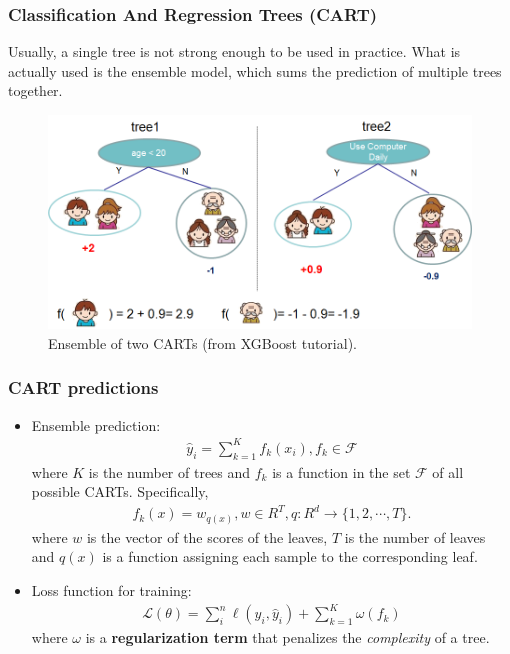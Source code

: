 \documentclass{beamer}
\begin{document}
\begin{frame}
	\frametitle{Classification And Regression Trees (CART)}
	Usually, a single tree is not strong enough to be used in practice. What is actually used is the ensemble model, which sums the prediction of multiple trees together.
	\begin{figure}
		\centering
		\includegraphics[scale=.5]{images/twocart}
		\caption{Ensemble of two CARTs (from XGBoost tutorial).}
		\label{fig:bagging}
	\end{figure}
\end{frame}

\begin{frame}
	\frametitle{CART predictions}
	
	\begin{itemize}
		\item Ensemble prediction:
		\begin{align*}
			\hat{y}_i = \sum_{k=1}^K f_k(x_i), f_k \in \mathcal{F}
		\end{align*}
		where $K$ is the number of trees and $f_k$ is a function in the set $\mathcal{F}$ of all possible CARTs. Specifically,
		\begin{align*}
			f_k(x) = w_{q(x)}, w \in R^T, q:R^d\rightarrow \{1,2,\cdots,T\} .
		\end{align*}
		where $w$ is the vector of the scores of the leaves, $T$ is the number of leaves and $q(x)$ is a function assigning each sample to the corresponding leaf.
		\item Loss function for training:
		\begin{align*}
			\mathcal{L}(\theta) = \sum_i^n \ell(y_i, \hat{y}_i) + \sum_{k=1}^K \omega(f_k)
		\end{align*}
		where $\omega$ is a \textbf{regularization term} that penalizes the \textit{complexity} of a tree.
	\end{itemize}
	
\end{frame}
\end{document}
